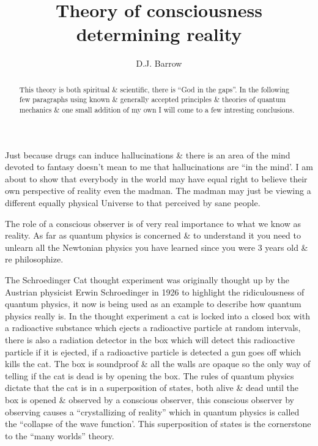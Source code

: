 \documentclass[twocolumn,showpacs,preprintnumbers,amsmath,amssymb]{revtex4}
\begin{document}
\title{Theory of consciousness determining reality}
\author{D.J. Barrow}
\begin{abstract}
This theory is both spiritual \& scientific,
there is ``God in the gaps''.
In the following few paragraphs using known \& generally
accepted principles \& theories of quantum mechanics \&
one small addition of my own I will come to a few intresting
conclusions.
\end{abstract}
\maketitle

Just because drugs can induce hallucinations \&
there is an area of the mind devoted to fantasy
doesn't mean to me that hallucinations are ``in the mind'.
I am about to show that everybody in the world may have equal
right to believe their own perspective of reality even the madman.
The madman may just be viewing a different equally physical Universe to
that perceived by sane people.

The role of a conscious observer is of very real importance 
to what we know as reality.
As far as quantum physics is concerned \& to understand it
you need to unlearn all the Newtonian physics you have learned
since you were 3 years old \& re philosophize.

The Schroedinger Cat thought experiment was originally thought up
by the Austrian physicist Erwin Schroedinger in 1926 to 
highlight the ridiculousness of quantum physics,
it now is being used as an example to describe how
quantum physics really is.
In the thought experiment a cat is locked into a closed box with a radioactive
substance which ejects a radioactive particle at
random intervals, there is also a radiation detector in the box 
which will detect this radioactive particle if it is ejected,
if a radioactive particle is detected a gun goes
off which kills the cat. The box is soundproof \& all
the walls are opaque so the only way of telling
if the cat is dead is by opening the box.
The rules of quantum physics dictate that the cat is in a
superposition of states, both alive \& dead
until the box is opened \& observed by a conscious
observer, this conscious observer by observing causes
a ``crystallizing of reality'' which
in quantum physics is called the ``collapse of the wave function'.
This superposition of states is the cornerstone to the
``many worlds'' theory.
\end{document}
